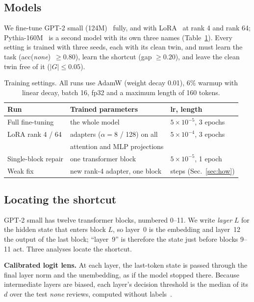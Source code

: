 \subsection{Models}
We fine-tune GPT-2 small (124M)~\cite{radford2019gpt2} fully, and with LoRA~\cite{hu2022lora} at rank 4 and rank 64;
Pythia-160M~\cite{biderman2023pythia} is a second model with its own three names (Table~\ref{tab:settings}). Every
setting is trained with three seeds, each with its clean twin, and must learn the task (acc(\textit{none})~$\ge
0.80$), learn the shortcut (gap $\ge 0.20$), and leave the clean twin free of it ($|G| \le 0.05$).

\begin{table}[t]
\centering
\caption{Training settings. All runs use AdamW (weight decay 0.01), 6\% warmup with linear decay, batch 16, fp32 and a
maximum length of 160 tokens.}
\label{tab:settings}
\footnotesize
\setlength{\tabcolsep}{3pt}
\begin{tabular}{@{}lll@{}}
\toprule
Run & Trained parameters & lr, length \\
\midrule
Full fine-tuning & the whole model & $5\!\times\!10^{-5}$, 3 epochs \\
LoRA rank 4 / 64 & adapters ($\alpha = 8$ / 128) on all & $5\!\times\!10^{-4}$, 3 epochs \\
 & attention and MLP projections & \\
Single-block repair & one transformer block & $5\!\times\!10^{-5}$, 1 epoch \\
Weak fix & new rank-4 adapter, one block & \lThreeStepBFullFT{} steps (Sec.~\ref{sec:how}) \\
\bottomrule
\end{tabular}
\end{table}

\subsection{Locating the shortcut}
GPT-2 small has twelve transformer blocks, numbered 0--11. We write \emph{layer} $L$ for the hidden state that enters
block $L$, so layer~0 is the embedding and layer~12 the output of the last block; ``layer~9'' is therefore the state
just before blocks 9--11 act. Three analyses locate the shortcut.

\textbf{Calibrated logit lens.} At each layer, the last-token state is passed through the final layer norm and the
unembedding, as if the model stopped there. Because intermediate layers are biased, each layer's decision threshold is
the median of its $d$ over the test \emph{none} reviews, computed without labels~\cite{halawi2024overthinking}.

